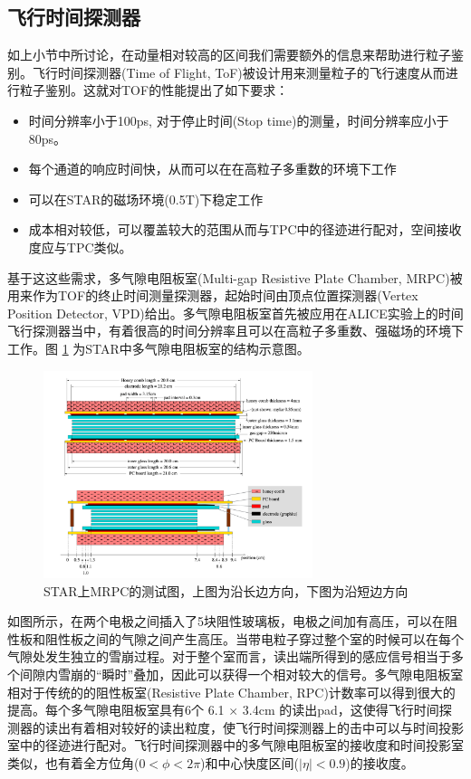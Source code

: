 \subsection{飞行时间探测器}

如上小节中所讨论，在动量相对较高的区间我们需要额外的信息来帮助进行粒子鉴别。飞行时间探测器(Time of Flight, ToF)被设计用来测量粒子的飞行速度从而进行粒子鉴别。这就对TOF的性能提出了如下要求：
\begin{itemize}
    \item 时间分辨率小于100ps, 对于停止时间(Stop time)的测量，时间分辨率应小于80ps。
    \item 每个通道的响应时间快，从而可以在在高粒子多重数的环境下工作
    \item 可以在STAR的磁场环境(0.5T)下稳定工作
    \item 成本相对较低，可以覆盖较大的范围从而与TPC中的径迹进行配对，空间接收度应与TPC类似。
\end{itemize}

基于这这些需求，多气隙电阻板室(Multi-gap Resistive Plate Chamber, MRPC)被用来作为TOF的终止时间测量探测器，起始时间由顶点位置探测器(Vertex Position Detector, VPD)给出。多气隙电阻板室首先被应用在ALICE实验上的时间飞行探测器当中，有着很高的时间分辨率且可以在高粒子多重数、强磁场的环境下工作。图 \ref{fig:MRPC} 为STAR中多气隙电阻板室的结构示意图。
\begin{figure}[htb]
    \begin{center}
    \includegraphics[width=0.7\textwidth,clip]{figures/Chapter2/MRPC.png}
    \end{center}
    \caption[MRPC结构示意图]{STAR上MRPC的测试图，上图为沿长边方向，下图为沿短边方向}
    \label{fig:MRPC}
\end{figure}
如图所示，在两个电极之间插入了5块阻性玻璃板，电极之间加有高压，可以在阻性板和阻性板之间的气隙之间产生高压。当带电粒子穿过整个室的时候可以在每个气隙处发生独立的雪崩过程。对于整个室而言，读出端所得到的感应信号相当于多个间隙内雪崩的“瞬时”叠加，因此可以获得一个相对较大的信号。多气隙电阻板室相对于传统的的阻性板室(Resistive Plate Chamber, RPC)计数率可以得到很大的提高。每个多气隙电阻板室具有6个 6.1 $\times$ 3.4cm 的读出pad，这使得飞行时间探测器的读出有着相对较好的读出粒度，使飞行时间探测器上的击中可以与时间投影室中的径迹进行配对。飞行时间探测器中的多气隙电阻板室的接收度和时间投影室类似，也有着全方位角($ 0 < \phi < 2\pi$)和中心快度区间($ |\eta| < 0.9 $)的接收度。

